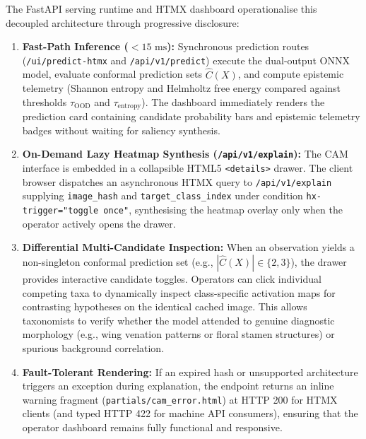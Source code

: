 The FastAPI serving runtime and HTMX dashboard operationalise this decoupled architecture through progressive disclosure:
\begin{enumerate}
    \item \textbf{Fast-Path Inference ($<15\text{ ms}$):} Synchronous prediction routes (\nolinkurl{/ui/predict-htmx} and \nolinkurl{/api/v1/predict}) execute the dual-output ONNX model, evaluate conformal prediction sets $\hat{C}(X)$, and compute epistemic telemetry (Shannon entropy and Helmholtz free energy compared against thresholds $\tau_{\text{OOD}}$ and $\tau_{\text{entropy}}$). The dashboard immediately renders the prediction card containing candidate probability bars and epistemic telemetry badges without waiting for saliency synthesis.
    \item \textbf{On-Demand Lazy Heatmap Synthesis (\texttt{/api/v1/explain}):} The CAM interface is embedded in a collapsible HTML5 \texttt{<details>} drawer. The client browser dispatches an asynchronous HTMX query to \nolinkurl{/api/v1/explain} supplying \texttt{image\_hash} and \texttt{target\_\allowbreak class\_\allowbreak index} under condition \texttt{hx-trigger="toggle once"}, synthesising the heatmap overlay only when the operator actively opens the drawer.
    \item \textbf{Differential Multi-Candidate Inspection:} When an observation yields a non-singleton conformal prediction set (e.g., $|\hat{C}(X)| \in \{2, 3\}$), the drawer provides interactive candidate toggles. Operators can click individual competing taxa to dynamically inspect class-specific activation maps for contrasting hypotheses on the identical cached image. This allows taxonomists to verify whether the model attended to genuine diagnostic morphology (e.g., wing venation patterns or floral stamen structures) or spurious background correlation.
    \item \textbf{Fault-Tolerant Rendering:} If an expired hash or unsupported architecture triggers an exception during explanation, the endpoint returns an inline warning fragment (\nolinkurl{partials/cam_error.html}) at HTTP 200 for HTMX clients (and typed HTTP 422 for machine API consumers), ensuring that the operator dashboard remains fully functional and responsive.
\end{enumerate}
